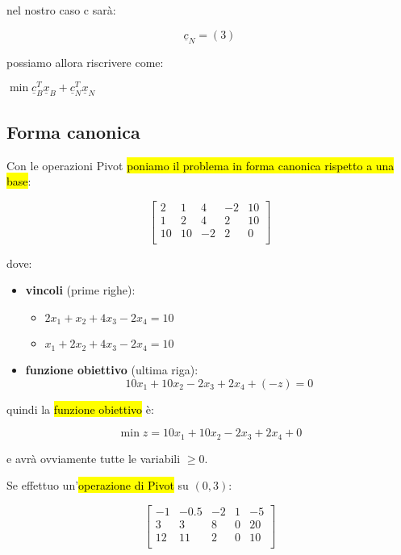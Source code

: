 nel nostro caso c sarà:

$$\underline{c}_N = (3)$$


possiamo allora riscrivere come:

$\min \underline{c}^T_B \underline{x}_B + \underline{c}^T_N \underline{x}_N$


\subsection{Forma canonica}

Con le operazioni Pivot \hl{poniamo il problema in forma canonica rispetto a una base}:


$$
\left[ {\begin{array}{ccccc}
	2  & 1  & 4   & -2 & 10\\
	1  & 2  & 4   & 2  & 10\\
	10 & 10 & -2  & 2  & 0 \\
\end{array} } \right]
$$


dove:

\begin{itemize}
	\item \textbf{vincoli} (prime righe):

		\begin{itemize}
			\item[] $2x_1 + x_2 + 4x_3 - 2x_4 = 10$
			\item[] $x_1 + 2x_2 + 4x_3 - 2x_4 = 10$
		\end{itemize}

	\item \textbf{funzione obiettivo} (ultima riga): $$10x_1 + 10x_2 - 2x_3 + 2x_4 + (-z) = 0$$

\end{itemize}

quindi la \hl{funzione obiettivo} è:

$$\min z = 10x_1 + 10x_2 - 2x_3 + 2x_4 + 0$$

e avrà ovviamente tutte le variabili $\geq  0$.


Se effettuo un'\hl{operazione di Pivot} su $(0, 3)$:


$$
\left[ {\begin{array}{ccccc}
	-1 & -0.5 & -2 & 1 & -5\\
	3  &   3  & 8  & 0 & 20\\
	12 &   11 & 2  & 0 & 10\\
\end{array} } \right]
$$

